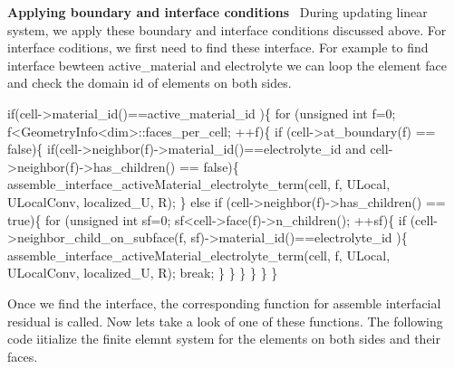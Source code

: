 {\bfseries Applying boundary and interface conditions}~\newline
 During updating linear system, we apply these boundary and interface conditions discussed above. For interface coditions, we first need to find these interface. For example to find interface bewteen active\+\_\+material and electrolyte we can loop the element face and check the domain id of elements on both sides. 
\begin{DoxyCode}
\textcolor{keywordflow}{if}(cell->material\_id()==active\_material\_id  )\{
    \textcolor{keywordflow}{for} (\textcolor{keywordtype}{unsigned} \textcolor{keywordtype}{int} f=0; f<GeometryInfo<dim>::faces\_per\_cell; ++f)\{
        \textcolor{keywordflow}{if} (cell->at\_boundary(f) == \textcolor{keyword}{false})\{
            \textcolor{keywordflow}{if}(cell->neighbor(f)->material\_id()==electrolyte\_id  and cell->neighbor(f)->has\_children() == \textcolor{keyword}{
      false})\{
              assemble\_interface\_activeMaterial\_electrolyte\_term(cell, f, ULocal, ULocalConv, localized\_U, 
      R);                                          
            \}
            \textcolor{keywordflow}{else} \textcolor{keywordflow}{if} (cell->neighbor(f)->has\_children() == \textcolor{keyword}{true})\{
                \textcolor{keywordflow}{for} (\textcolor{keywordtype}{unsigned} \textcolor{keywordtype}{int} sf=0; sf<cell->face(f)->n\_children(); ++sf)\{
                    \textcolor{keywordflow}{if} (cell->neighbor\_child\_on\_subface(f, sf)->material\_id()==electrolyte\_id )\{
                      assemble\_interface\_activeMaterial\_electrolyte\_term(cell, f, ULocal, ULocalConv, 
      localized\_U, R);                                                                
                        \textcolor{keywordflow}{break};
                    \}
                \}
            \}
        \}
    \}
\}
\end{DoxyCode}
 Once we find the interface, the corresponding function for assemble interfacial residual is called. Now let\textquotesingle{}s take a look of one of these functions. The following code iitialize the finite elemnt system for the elements on both sides and their faces. 
